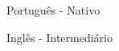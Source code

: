 
\begin{cventries}
  \cventry
    {}
    {
      \begin{cvitems} %
        \item {Português - Nativo}
        \item {Inglês - Intermediário}
      \end{cvitems}
    }
    {} {} {}

\end{cventries}